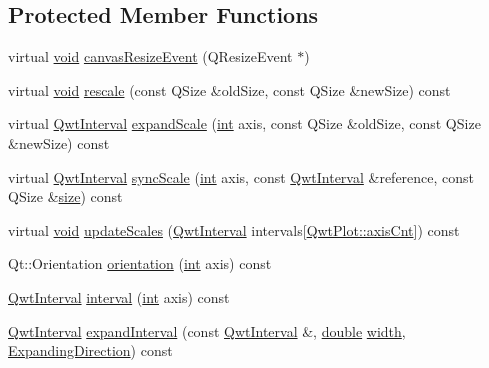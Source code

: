 \subsection*{Protected Member Functions}
\begin{DoxyCompactItemize}
\item 
virtual \hyperlink{group___u_a_v_objects_plugin_ga444cf2ff3f0ecbe028adce838d373f5c}{void} \hyperlink{class_qwt_plot_rescaler_a5490a4a1b576b1118c095cc54810e2aa}{canvas\-Resize\-Event} (Q\-Resize\-Event $\ast$)
\item 
virtual \hyperlink{group___u_a_v_objects_plugin_ga444cf2ff3f0ecbe028adce838d373f5c}{void} \hyperlink{class_qwt_plot_rescaler_a6c609a90c617ddddb5c0e282ceeeeeac}{rescale} (const Q\-Size \&old\-Size, const Q\-Size \&new\-Size) const 
\item 
virtual \hyperlink{class_qwt_interval}{Qwt\-Interval} \hyperlink{class_qwt_plot_rescaler_ae3eb4d18dcd9ace4b7eb0bd05216c957}{expand\-Scale} (\hyperlink{ioapi_8h_a787fa3cf048117ba7123753c1e74fcd6}{int} axis, const Q\-Size \&old\-Size, const Q\-Size \&new\-Size) const 
\item 
virtual \hyperlink{class_qwt_interval}{Qwt\-Interval} \hyperlink{class_qwt_plot_rescaler_a1a83473ef31ff45d1595eca80c2d3b1d}{sync\-Scale} (\hyperlink{ioapi_8h_a787fa3cf048117ba7123753c1e74fcd6}{int} axis, const \hyperlink{class_qwt_interval}{Qwt\-Interval} \&reference, const Q\-Size \&\hyperlink{glext_8h_a014d89bd76f74ef3a29c8f04b473eb76}{size}) const 
\item 
virtual \hyperlink{group___u_a_v_objects_plugin_ga444cf2ff3f0ecbe028adce838d373f5c}{void} \hyperlink{class_qwt_plot_rescaler_a999de79352fda2a89e32d1a8831fa5fd}{update\-Scales} (\hyperlink{class_qwt_interval}{Qwt\-Interval} intervals\mbox{[}\hyperlink{class_qwt_plot_a81df699dcf9dde0752c0726b5f31e271aea62036dfd48ee0f9450718592614892}{Qwt\-Plot\-::axis\-Cnt}\mbox{]}) const 
\item 
Qt\-::\-Orientation \hyperlink{class_qwt_plot_rescaler_a5afb70d8dc928dedcb7daa3f95e7d506}{orientation} (\hyperlink{ioapi_8h_a787fa3cf048117ba7123753c1e74fcd6}{int} axis) const 
\item 
\hyperlink{class_qwt_interval}{Qwt\-Interval} \hyperlink{class_qwt_plot_rescaler_a52a1d762ba0add0a49c632a735d624c1}{interval} (\hyperlink{ioapi_8h_a787fa3cf048117ba7123753c1e74fcd6}{int} axis) const 
\item 
\hyperlink{class_qwt_interval}{Qwt\-Interval} \hyperlink{class_qwt_plot_rescaler_ad3da887bf71befccf1f3094da448a502}{expand\-Interval} (const \hyperlink{class_qwt_interval}{Qwt\-Interval} \&, \hyperlink{_super_l_u_support_8h_a8956b2b9f49bf918deed98379d159ca7}{double} \hyperlink{glext_8h_a76aaa5c50746272e7d2de9aece921757}{width}, \hyperlink{class_qwt_plot_rescaler_a1c314e9513cef076a79381111aa67585}{Expanding\-Direction}) const 
\end{DoxyCompactItemize}


